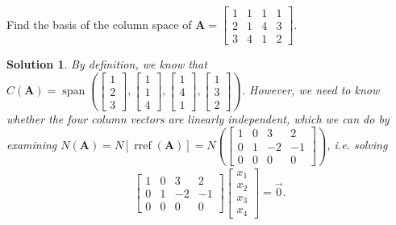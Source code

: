 \documentclass[]{book}
\DeclareMathOperator{\rref}{rref}
\DeclareMathOperator{\vecspan}{span}
\newcommand{\vecxxxx}[1][x]{\ensuremath{\begin{bmatrix}
#1_1 \\
#1_2 \\
#1_3 \\
#1_4
\end{bmatrix}}}
\newcommand{\mat}[1]{\ensuremath{\mathbf{#1}}}
\newtheorem*{solution}{Solution}
\begin{document}
\begin{example}
    \label{expl:basis_column_space_complex}
    Find the basis of the column space of $\mat{A} = \begin{bmatrix}1 & 1 & 1 & 1 \\ 2 & 1 & 4 & 3 \\ 3 & 4 & 1 & 2\end{bmatrix}$.
\begin{solution}
    By definition, we know that $C(\mat{A}) = \vecspan\left(\begin{bmatrix}1 \\2\\3\end{bmatrix},\begin{bmatrix}1\\1\\4\end{bmatrix},\begin{bmatrix}1\\4\\1\end{bmatrix},\begin{bmatrix}1\\3\\2\end{bmatrix}\right)$. However, we need to know whether the four column vectors are linearly independent, which we can do by examining $N(\mat{A})=N[\rref(\mat{A})]=N\left(\begin{bmatrix}\boxed{1} & 0 & 3 & 2 \\ 0 & \boxed{1} & -2 & -1 \\ 0 & 0 & 0 & 0\end{bmatrix}\right)$, i.e. solving
    \begin{align*}
        \begin{bmatrix}1 & 0 & 3 & 2 \\ 0 & 1 & -2 & -1 \\ 0 & 0 & 0 & 0\end{bmatrix}\vecxxxx = \vec{0}.
    \end{align*}

\end{solution}
\end{example}
\end{document}

